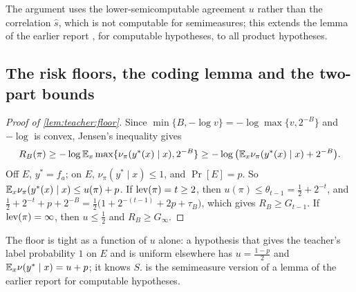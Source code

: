 The argument uses the lower-semicomputable agreement $u$ rather than the correlation $\hat s$, which is not computable for semimeasures; this extends the lemma of the earlier report \citep{claude2026whatfollows}, for computable hypotheses, to all product hypotheses.

\subsection{The risk floors, the coding lemma and the two-part bounds}\label{app:teacher:lemmas}

\begin{proof}[Proof of \cref{lem:teacher:floor}]
Since $\min\{B,-\log v\}=-\log\max\{v,2^{-B}\}$ and $-\log$ is convex, Jensen's inequality gives
\[
R_B(\pi)\ge-\log\mathbb{E}_x\max\{\nu_\pi(y^*(x)\mid x),2^{-B}\}\ge-\log\big(\mathbb{E}_x\nu_\pi(y^*(x)\mid x)+2^{-B}\big).
\]
Off $E$, $y^*=f_a$; on $E$, $\nu_\pi(y^*\mid x)\le1$, and $\Pr[E]=p$. So $\mathbb{E}_x\nu_\pi(y^*(x)\mid x)\le u(\pi)+p$. If $\operatorname{lev}(\pi)=t\ge2$, then $u(\pi)\le\theta_{t-1}=\frac12+2^{-t}$, and $\frac12+2^{-t}+p+2^{-B}=\frac12\big(1+2^{-(t-1)}+2p+\tau_B\big)$, which gives $R_B\ge G_{t-1}$. If $\operatorname{lev}(\pi)=\infty$, then $u\le\frac12$ and $R_B\ge G_\infty$.
\end{proof}

The floor is tight as a function of $u$ alone: a hypothesis that gives the teacher's label probability $1$ on $E$ and is uniform elsewhere has $u=\frac{1-p}2$ and $\mathbb{E}_x\nu(y^*\mid x)=u+p$; it knows $S$.  is the semimeasure version of a lemma of the earlier report \citep{claude2026whatfollows} for computable hypotheses.


